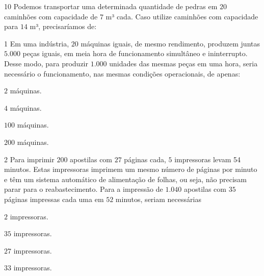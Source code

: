 {

\num{10}  Podemos transportar uma determinada quantidade de pedras em $20$
caminhões com capacidade de $7$ m³ cada. Caso utilize caminhões com
capacidade para $14$ m³, precisaríamos de:



\num{1}  Em uma indústria, $20$ máquinas iguais, de mesmo rendimento, produzem
juntas $5.000$ peças iguais, em meia hora de funcionamento simultâneo e
ininterrupto. Desse modo, para produzir $1.000$ unidades das mesmas peças
em uma hora, seria necessário o funcionamento, nas mesmas condições
operacionais, de apenas:

\begin{escolha}
\item $2$ máquinas.
\item $4$ máquinas.
\item $100$ máquinas.
\item $200$ máquinas.
\end{escolha}



\num{2}  Para imprimir $200$ apostilas com $27$ páginas cada, $5$ impressoras levam
54 minutos. Estas impressoras imprimem um mesmo número de páginas por
minuto e têm um sistema automático de alimentação de folhas, ou seja,
não precisam parar para o reabastecimento. Para a impressão de $1.040$
apostilas com $35$ páginas impressas cada uma em $52$ minutos, seriam
necessárias

\begin{escolha}
\item $2$ impressoras.
\item $35$ impressoras.
\item $27$ impressoras.
\item $33$ impressoras.
\end{escolha}

}
